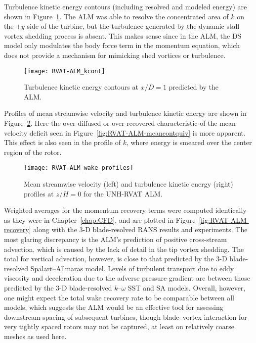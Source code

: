 Turbulence kinetic energy contours (including resolved and modeled energy) are
shown in Figure~\ref{fig:RVAT-ALM-kcont}. The ALM was able to resolve the
concentrated area of $k$ on the $+y$ side of the turbine, but the turbulence
generated by the dynamic stall vortex shedding process is absent. This makes
sense since in the ALM, the DS model only modulates the body force term in the
momentum equation, which does not provide a mechanism for mimicking shed
vortices or turbulence.

\begin{figure}
    \centering

    \texttt{[image: RVAT-ALM\_kcont]}

    \caption{Turbulence kinetic energy contours at $x/D=1$ predicted by the
        ALM.}

    \label{fig:RVAT-ALM-kcont}
\end{figure}

Profiles of mean streamwise velocity and turbulence kinetic energy are shown in
Figure~\ref{fig:RVAT-ALM-profiles}. Here the over-diffused or over-recovered
characteristic of the mean velocity deficit seen in
Figure~\ref{fig:RVAT-ALM-meancontquiv} is more apparent. This effect is also
seen in the profile of $k$, where energy is smeared over the center region of
the rotor.

\begin{figure}
    \centering

    \texttt{[image: RVAT-ALM\_wake-profiles]}

    \caption{Mean streamwise velocity (left) and turbulence kinetic energy
        (right) profiles at $z/H=0$ for the UNH-RVAT ALM.}

    \label{fig:RVAT-ALM-profiles}
\end{figure}

Weighted averages for the momentum recovery terms were computed identically as
they were in Chapter~\ref{chap:CFD}, and are plotted in
Figure~\ref{fig:RVAT-ALM-recovery} along with the 3-D blade-resolved RANS
results and experiments. The most glaring discrepancy is the ALM's prediction of
positive cross-stream advection, which is caused by the lack of detail in the
tip vortex shedding. The total for vertical advection, however, is close to that
predicted by the 3-D blade-resolved Spalart--Allmaras model. Levels of turbulent
transport due to eddy viscosity and deceleration due to the adverse pressure
gradient are between those predicted by the 3-D blade-resolved $k$--$\omega$ SST
and SA models. Overall, however, one might expect the total wake recovery rate
to be comparable between all models, which suggests the ALM would be an
effective tool for assessing downstream spacing of subsequent turbines, though
blade--vortex interaction for very tightly spaced rotors may not be captured, at
least on relatively coarse meshes as used here.

